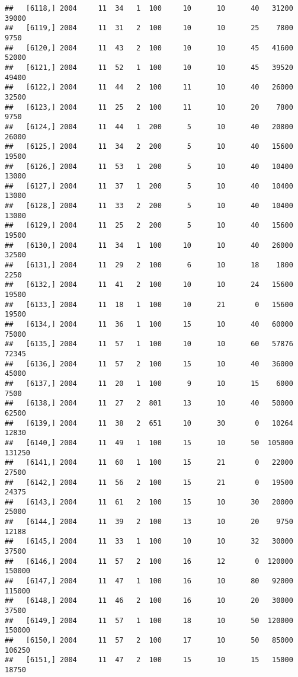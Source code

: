 \documentclass{article}\usepackage[]{graphicx}\usepackage[]{color}
\makeatletter
\newenvironment{kframe}{%
 \def\at@end@of@kframe{}%
 \ifinner\ifhmode%
  \def\at@end@of@kframe{\end{minipage}}%
  \begin{minipage}{\columnwidth}%
 \fi\fi%
 \def\FrameCommand##1{\hskip\@totalleftmargin \hskip-\fboxsep
 \colorbox{shadecolor}{##1}\hskip-\fboxsep
     \hskip-\linewidth \hskip-\@totalleftmargin \hskip\columnwidth}%
 \MakeFramed {\advance\hsize-\width
   \@totalleftmargin\z@ \linewidth\hsize
   \@setminipage}}%
 {\par\unskip\endMakeFramed%
 \at@end@of@kframe}
\newenvironment{knitrout}{}{} %
\makeatother
\begin{document}
\begin{knitrout}
\begin{kframe}
\begin{verbatim}
##   [6118,] 2004     11  34   1  100     10      10      40   31200   39000
##   [6119,] 2004     11  31   2  100     10      10      25    7800    9750
##   [6120,] 2004     11  43   2  100     10      10      45   41600   52000
##   [6121,] 2004     11  52   1  100     10      10      45   39520   49400
##   [6122,] 2004     11  44   2  100     11      10      40   26000   32500
##   [6123,] 2004     11  25   2  100     11      10      20    7800    9750
##   [6124,] 2004     11  44   1  200      5      10      40   20800   26000
##   [6125,] 2004     11  34   2  200      5      10      40   15600   19500
##   [6126,] 2004     11  53   1  200      5      10      40   10400   13000
##   [6127,] 2004     11  37   1  200      5      10      40   10400   13000
##   [6128,] 2004     11  33   2  200      5      10      40   10400   13000
##   [6129,] 2004     11  25   2  200      5      10      40   15600   19500
##   [6130,] 2004     11  34   1  100     10      10      40   26000   32500
##   [6131,] 2004     11  29   2  100      6      10      18    1800    2250
##   [6132,] 2004     11  41   2  100     10      10      24   15600   19500
##   [6133,] 2004     11  18   1  100     10      21       0   15600   19500
##   [6134,] 2004     11  36   1  100     15      10      40   60000   75000
##   [6135,] 2004     11  57   1  100     10      10      60   57876   72345
##   [6136,] 2004     11  57   2  100     15      10      40   36000   45000
##   [6137,] 2004     11  20   1  100      9      10      15    6000    7500
##   [6138,] 2004     11  27   2  801     13      10      40   50000   62500
##   [6139,] 2004     11  38   2  651     10      30       0   10264   12830
##   [6140,] 2004     11  49   1  100     15      10      50  105000  131250
##   [6141,] 2004     11  60   1  100     15      21       0   22000   27500
##   [6142,] 2004     11  56   2  100     15      21       0   19500   24375
##   [6143,] 2004     11  61   2  100     15      10      30   20000   25000
##   [6144,] 2004     11  39   2  100     13      10      20    9750   12188
##   [6145,] 2004     11  33   1  100     10      10      32   30000   37500
##   [6146,] 2004     11  57   2  100     16      12       0  120000  150000
##   [6147,] 2004     11  47   1  100     16      10      80   92000  115000
##   [6148,] 2004     11  46   2  100     16      10      20   30000   37500
##   [6149,] 2004     11  57   1  100     18      10      50  120000  150000
##   [6150,] 2004     11  57   2  100     17      10      50   85000  106250
##   [6151,] 2004     11  47   2  100     15      10      15   15000   18750

\end{verbatim}
\end{kframe}
\end{knitrout}
\end{document}

